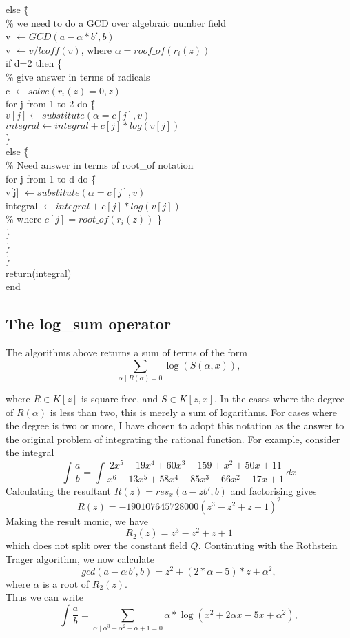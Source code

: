 \begin{tabbing}
\> \> else \= \{ \\
\> \> \> \%  we need to do a GCD over algebraic number field\\
\> \> \> v $\leftarrow GCD(a-\alpha*b',b)  $ \\
\> \> \> v $\leftarrow v/lcoff(v) $, \hspace{3 mm}
 where $\alpha=roof\_of(r_{i}(z)) $\\ 
\> \> if d=2 then \= \{ \\
\> \> \> \% give answer in terms of radicals  \\
\> \> \> c $\leftarrow solve(r_{i}(z)=0,z) $ \\
\> \> \> for j from 1 to 2 do \= \{ \\
\> \> \> $v[j] \leftarrow substitute(\alpha=c[j],v) $ \\
\> \> \> $integral \leftarrow integral+c[j]*log(v[j]) $ \\
\> \> \> \} \\
\> \> \> else \= \{ \\
\> \> \> \% Need answer in terms of root\_of notation \\
\> \> \> for j from 1 to d do \= \{ \\
\> \> \>  v[j] $\leftarrow substitute(\alpha=c[j],v) $ \\
\> \> \> integral $ \leftarrow integral+c[j]*log(v[j]) $ \\
\> \> \> \% where $c[j]=root\_of(r_{i}(z))$ \} \\
\> \> \> \} \\
\> \> \} \\
\> \} \\
return(integral) \\
end
\end{tabbing}

\subsection{The log\_sum operator}
The algorithms above returns a sum of terms of the form
\[ \sum_{\alpha \mid R(\alpha)=0} \log(S(\alpha,x)), \]

where $R \in K[z]$ is square free, and $S \in K[z,x]$. In the cases where the degree of $R(\alpha)$ is less than two, this is merely a sum of logarithms. For cases where the degree is two or more, I have chosen to adopt this notation as the answer to the original problem of integrating the rational function. For example,
consider the integral
 \[ \int \frac{a}{b}=\int \frac{2x^5-19x^4+60x^3-159+x^2+50x+11}{x^6-13x^5+58x^4-85x^3-66x^2-17x+1}\, dx \]
Calculating the resultant $R(z)=res_x(a-zb',b)$ and factorising gives
  \[ R(z)=-190107645728000(z^3-z^2+z+1)^{2} \]
Making the result monic, we have
\[ R_2(z)=z^3-z^2+z+1 \]
which does not split over the constant field $Q$.
Continuting with the Rothstein Trager algorithm, we now calculate 
\[ gcd(a-\alpha\,b',b)=z^2+(2*\alpha-5)*z+\alpha^2, \] where $\alpha$ is a root of $R_2(z)$. \\
Thus we can write
\[ \int \frac{a}{b}= \sum_{\alpha \mid \alpha^3-\alpha^2+\alpha+1=0} \alpha*\log(x^2+2\alpha x-5x+\alpha^2), \]

